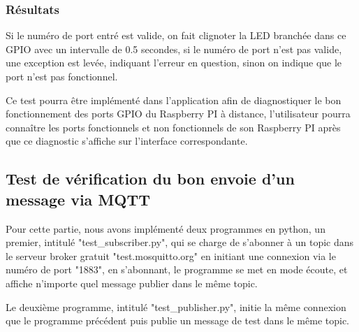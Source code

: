 \documentclass[12pt,a4paper]{article}
\begin{document}
\subsubsection{Résultats}
Si le numéro de port entré est valide, on fait clignoter la LED branchée dans ce GPIO avec un intervalle de 0.5 secondes, si le numéro de port n'est pas valide, une exception est levée, indiquant l'erreur en question, sinon on indique que le port n'est pas fonctionnel.\par
Ce test pourra être implémenté dans l'application afin de diagnostiquer le bon fonctionnement des ports GPIO du Raspberry PI à distance, l'utilisateur pourra connaître les ports fonctionnels et non fonctionnels de son Raspberry PI après que ce diagnostic s'affiche sur l'interface correspondante. 

\subsection{Test de vérification du bon envoie d'un message via MQTT}
Pour cette partie, nous avons implémenté deux programmes en python, un premier, intitulé "test\_subscriber.py", qui se charge de s'abonner à un topic dans le serveur broker gratuit "test.mosquitto.org" en initiant une connexion via le numéro de port "1883", en s'abonnant, le programme se met en mode écoute, et affiche n'importe quel message publier dans le même topic.\par
Le deuxième programme, intitulé "test\_publisher.py", initie la même connexion que le programme précédent puis publie un message de test dans le même topic.
\end{document}
